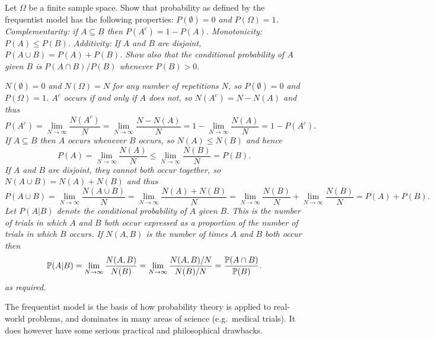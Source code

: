 \begin{exercise}
Let $\Omega$ be a finite sample space. Show that probability as defined by the frequentist model has the following properties:
\ben
\it $P(\emptyset)=0$ and $P(\Omega)=1$.
\it Complementarity: if $A\subseteq B$ then $P(A^c) = 1 - P(A)$.
\it Monotonicity: $P(A)\leq P(B)$.
\it Additivity: If $A$ and $B$ are disjoint, $P(A\cup B) = P(A) + P(B)$.
\een
Show also that the conditional probability of $A$ given $B$ is $P(A\cap B)/P(B)$ whenever $P(B)>0$.

\begin{answer}
\ben
\it 
$N(\emptyset)=0$ and $N(\Omega)=N$ for any number of repetitions $N$, so $P(\emptyset)=0$ and $P(\Omega)=1$.
\it 
$A^c$ occurs if and only if $A$ does not, so $N(A^c) = N - N(A)$ and thus
\[
P(A^c) 
	= \lim_{N\to\infty}\frac{N(A^c)}{N}
	= \lim_{N\to\infty}\frac{N - N(A)}{N}
	= 1 - \lim_{N\to\infty}\frac{N(A)}{N}
	= 1 - P(A^c).
\]
\it
If $A\subseteq B$ then $A$ occurs whenever $B$ occurs, so $N(A)\leq N(B)$ and hence
\[
P(A)
	= \lim_{N\to\infty}\frac{N(A)}{N}
	\leq \lim_{N\to\infty}\frac{N(B)}{N}
	= P(B).
\]
\it
If $A$ and $B$ are disjoint, they cannot both occur together, so $N(A\cup B)=N(A)+N(B)$ and thus
\[
P(A\cup B)
	= \lim_{N\to\infty}\frac{N(A\cup B)}{N}
	= \lim_{N\to\infty}\frac{N(A)+N(B)}{N}
	= \lim_{N\to\infty}\frac{N(B)}{N} + \lim_{N\to\infty}\frac{N(B)}{N}
	= P(A) + P(B).
\]
\een
Let $P(A|B)$ denote the conditional probability of $A$ given $B$. This is the number of trials in which $A$ and $B$ both occur expressed as a proportion of the number of trials in which $B$ occurs. If $N(A,B)$ is the number of times $A$ and $B$ both occur then
\[
\mathbb{P}(A|B)	= \lim_{N\to\infty}\frac{N(A,B)}{N(B)} 
		= \lim_{N\to\infty}\frac{N(A,B)/N}{N(B)/N} 
		= \frac{\mathbb{P}(A\cap B)}{\mathbb{P}(B)}.
\]
as required.
\end{answer}
\end{exercise}

The frequentist model is the basis of how probability theory is applied to real-world problems, and dominates in many areas of science (e.g.\ medical trials). It does however have some serious practical and philosophical drawbacks.

